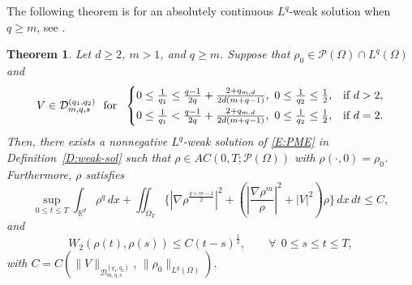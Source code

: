 \documentclass{amsart}
\newtheorem{theorem}[defn]{Theorem}
\numberwithin{equation}{section}
\newcommand{\abs}[1]{\left| #1 \right|}
\begin{document}
%
The following theorem is for an absolutely continuous $L^q$-weak solution when $q\geq m$, see \cite[Theorem~2.12]{HKK02}. 
\begin{theorem}\label{T:ACweakSol:divfree:PME}
Let $d\geq 2$, $m>1$, and $q\geq m$.  
Suppose that  $\rho_0 \in  \mathcal{P}(\Omega) \cap L^{q}(\Omega)$ and 
\begin{equation}\label{T:ACweakSol:divfree:V:PME}
\begin{aligned}
		 V \in 
			\mathcal{D}_{m,q,s}^{(q_1,q_2)}  
		\  \text{ for } \ 
	\begin{cases}
0 \leq \frac{1}{q_1} \leq \frac{q-1}{2q} + \frac{2+q_{m,d}}{2d(m+q-1)},  \ 0 \leq \frac{1}{q_2} \leq \frac{1}{2}, & \text{if } d>2, \vspace{1mm}\\
0 \leq \frac{1}{q_1} < \frac{q-1}{2q} + \frac{2+q_{m,d}}{2d(m+q-1)}, \ 0 \leq \frac{1}{q_2} \leq \frac{1}{2}, & \text{if } d=2.
\end{cases} 
\end{aligned}
\end{equation}
Then, there exists a nonnegative $L^q$-weak solution of \eqref{E:PME} in Definition~\ref{D:weak-sol} such that  $\rho \in AC(0,T; \mathcal{P} (\Omega))$ with $\rho(\cdot, 0)=\rho_0$.
Furthermore, $\rho$ satisfies 
\[
 \sup_{0\leq t \leq T} \int_{\mathbb{R}^d}  \rho^q  \,dx
 + \iint_{\Omega_T} \{ \left| \nabla \rho^{\frac{q+m-1}{2}}\right |^2 + \left(\abs{\frac{\nabla \rho^m}{\rho}}^{2}+|V|^{2}\right ) \rho \} \,dx\,dt \leq C,
\]
and 
\[
 W_{2}(\rho(t),\rho(s))\leq C (t-s)^{\frac{1}{2}},\qquad
\forall ~~0\leq s\leq t\leq T,
\]
with $C = C (\|V\|_{\mathcal{D}_{m,q,s}^{(q_1,q_2)}}, \,\|\rho_{0}\|_{L^{q} (\Omega)})$.
\end{theorem}
\end{document}

